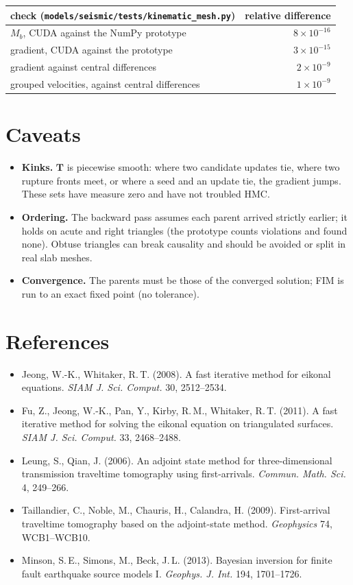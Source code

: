 \documentclass[11pt]{article}
\newcommand{\T}{\bm{T}}
\begin{document}
\begin{table}[h]
\centering
\begin{tabular}{lr}
\toprule
check (\texttt{models/seismic/tests/kinematic\_mesh.py}) & relative difference \\
\midrule
$M_b$, CUDA against the NumPy prototype & $8\times10^{-16}$ \\
gradient, CUDA against the prototype & $3\times10^{-15}$ \\
gradient against central differences & $2\times10^{-9}$ \\
grouped velocities, against central differences & $1\times10^{-9}$ \\
\bottomrule
\end{tabular}
\end{table}

\section{Caveats}

\begin{itemize}
\item \textbf{Kinks.} $\T$ is piecewise smooth: where two candidate updates tie, where two rupture
fronts meet, or where a seed and an update tie, the gradient jumps. These sets have measure zero
and have not troubled HMC.
\item \textbf{Ordering.} The backward pass assumes each parent arrived strictly earlier; it holds on
acute and right triangles (the prototype counts violations and found none). Obtuse triangles can
break causality and should be avoided or split in real slab meshes.
\item \textbf{Convergence.} The parents must be those of the converged solution; FIM is run to an
exact fixed point (no tolerance).
\end{itemize}

\section*{References}
\small
\begin{itemize}
\item Jeong, W.-K., Whitaker, R.\,T. (2008). A fast iterative method for eikonal equations.
\emph{SIAM J. Sci. Comput.} 30, 2512--2534.
\item Fu, Z., Jeong, W.-K., Pan, Y., Kirby, R.\,M., Whitaker, R.\,T. (2011). A fast iterative method
for solving the eikonal equation on triangulated surfaces. \emph{SIAM J. Sci. Comput.} 33,
2468--2488.
\item Leung, S., Qian, J. (2006). An adjoint state method for three-dimensional transmission
traveltime tomography using first-arrivals. \emph{Commun. Math. Sci.} 4, 249--266.
\item Taillandier, C., Noble, M., Chauris, H., Calandra, H. (2009). First-arrival traveltime
tomography based on the adjoint-state method. \emph{Geophysics} 74, WCB1--WCB10.
\item Minson, S.\,E., Simons, M., Beck, J.\,L. (2013). Bayesian inversion for finite fault earthquake
source models I. \emph{Geophys. J. Int.} 194, 1701--1726.
\end{itemize}
\end{document}
